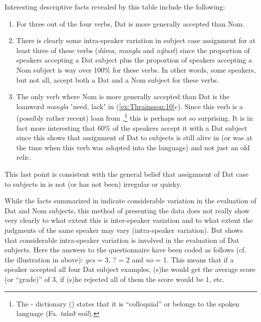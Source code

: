 \documentclass[output=paper]{LSP/langsci}
\begin{document}
\clearpage Interesting descriptive facts revealed by this table include the following:
\begin{enumerate}
 \item For three out of the four verbs, Dat is more generally accepted than Nom.
 \item There is clearly some intra-speaker variation in subject case assignment for at least three of these verbs (\textit{dáma}, \textit{mangla} and \textit{nýtast}) since the proportion of speakers accepting a Dat subject plus the proportion of speakers accepting a Nom subject is way over 100\% for these verbs. In other words, some speakers, but not all, accept both a Dat and a Nom subject for these verbs.
 \item The only verb where Nom is more generally accepted than Dat is the  loanword \textit{mangla} ʽneed, lackʼ in (\ref{ex:Thrainsson:10}c). Since this verb is a (possibly rather recent) loan from ,\footnote{The - dictionary \textit{} (\citealt{Føroysk1998}) states that it is ``colloquial'' or belongs to the spoken language (Fa. \textit{talað mál}).} this is perhaps not so surprising. It is in fact more interesting that 60\% of the speakers accept it with a Dat subject since this shows that assignment of Dat to subjects is still alive in  (or was at the time when this verb was adopted into the language) and not just an old relic.
\end{enumerate}

This last point is consistent with the general belief that assignment of Dat case to subjects in  is not (or has not been) irregular or quirky.

While the facts summarized in  indicate considerable variation in the evaluation of Dat and Nom subjects, this method of presenting the data does not really show very clearly to what extent this is inter-speaker variation and to what extent the judgments of the same speaker may vary (intra-speaker variation). But  shows that considerable intra-speaker variation is involved in the evaluation of Dat subjects. Here the answers to the questionnaire have been coded as follows (cf. the illustration in  above): \textit{yes} = 3, ? = 2 and \textit{no} = 1. This means that if a speaker accepted all four Dat subject examples, (s)he would get the average score (or “grade)” of 3, if (s)he rejected all of them the score would be 1, etc.
\end{document}
